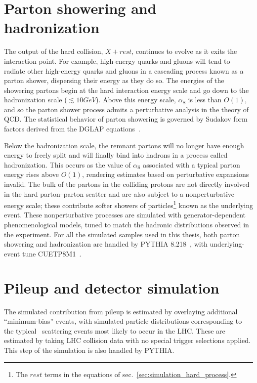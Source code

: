 \documentclass[oneside, letterpaper, 12pt, oldfontcommands]{memoir}
\begin{document}
\section{Parton showering and hadronization} \label{sec:simulation_parton_shower_hadronization}
The output of the hard collision, $X + rest$, continues to evolve as it exits the interaction point.
For example, high-energy quarks and gluons will tend to radiate other high-energy quarks and gluons in a cascading process
known as a parton shower, dispersing their energy as they do so. The energies of the showering partons begin at the hard interaction energy scale
and go down to the hadronization scale (${\lesssim}10\unit{GeV}$). Above this energy scale, $\alpha_\mathrm{S}$ is less than $O(1)$, and so the parton
shower process admits a perturbative analysis in the theory of QCD.
The statistical behavior of parton showering is governed by Sudakov form factors derived from the DGLAP equations~\cite{ref:0034-4885/70/1/R02}.

Below the hadronization scale, the remnant partons will no longer have enough energy to freely split and will finally bind into hadrons
in a process called hadronization. This occurs as the value of $\alpha_\mathrm{S}$ associated with a typical parton energy rises above $O(1)$, rendering estimates
based on perturbative expansions invalid. The bulk of the partons in the colliding protons are not directly involved in the hard parton--parton scatter and are also subject
to a nonperturbative energy scale; these contribute softer showers of particles\footnote{The $rest$ terms in the equations of sec.~\ref{sec:simulation_hard_process}.}
known as the underlying event.
These nonperturbative processes are simulated with generator-dependent phenomenological models, tuned to match the hadronic distributions observed in the experiment.
For all the simulated samples used in this thesis, both parton showering and hadronization are handled by PYTHIA 8.218~\cite{ref:j.cpc.2015.01.024},
with underlying-event tune CUETP8M1~\cite{ref:epjc/s10052-016-3988-x}.

\section{Pileup and detector simulation} \label{sec:simulation_detector}
The simulated contribution from pileup is estimated by overlaying additional ``minimum-bias'' events, with simulated particle distributions
corresponding to the typical \Pp\Pp\ scattering events most likely to occur in the LHC. These are estimated by taking LHC collision data with no
special trigger selections applied. This step of the simulation is also handled by PYTHIA.
\end{document}
